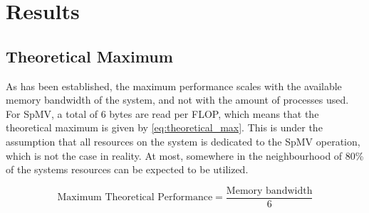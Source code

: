 \chapter{Results} \label{results}

\section{Theoretical Maximum}
As has been established, the maximum performance scales with the available memory bandwidth of the system, and not with the amount of processes used. For SpMV, a total of 6 bytes are read per FLOP, which means that the theoretical maximum is given by \ref{eq:theoretical_max}. This is under the assumption that all resources on the system is dedicated to the SpMV operation, which is not the case in reality. At most, somewhere in the neighbourhood of 80\% of the systems resources can be expected to be utilized.

\begin{equation}
\text{Maximum Theoretical Performance} = \frac{\text{Memory bandwidth}}{6}
\label{eq:theoretical_max}
\end{equation}


